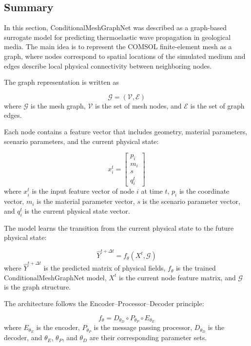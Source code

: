 \subsection{Summary}

In this section, ConditionalMeshGraphNet was described as a graph-based surrogate model for predicting thermoelastic wave propagation in geological media. The main idea is to represent the COMSOL finite-element mesh as a graph, where nodes correspond to spatial locations of the simulated medium and edges describe local physical connectivity between neighboring nodes.

The graph representation is written as

\begin{equation}
\mathcal{G}
=
(\mathcal{V},\mathcal{E})
\end{equation}
where \(\mathcal{G}\) is the mesh graph, \(\mathcal{V}\) is the set of mesh nodes, and \(\mathcal{E}\) is the set of graph edges.

Each node contains a feature vector that includes geometry, material parameters, scenario parameters, and the current physical state:

\begin{equation}
x_i^t
=
\begin{bmatrix}
p_i \\
m_i \\
s \\
q_i^t
\end{bmatrix}
\end{equation}
where \(x_i^t\) is the input feature vector of node \(i\) at time \(t\), \(p_i\) is the coordinate vector, \(m_i\) is the material parameter vector, \(s\) is the scenario parameter vector, and \(q_i^t\) is the current physical state vector.

The model learns the transition from the current physical state to the future physical state:

\begin{equation}
\hat{Y}^{t+\Delta t}
=
f_{\theta}
\left(
X^{t},
\mathcal{G}
\right)
\end{equation}
where \(\hat{Y}^{t+\Delta t}\) is the predicted matrix of physical fields, \(f_{\theta}\) is the trained ConditionalMeshGraphNet model, \(X^{t}\) is the current node feature matrix, and \(\mathcal{G}\) is the graph structure.

The architecture follows the Encoder--Processor--Decoder principle:

\begin{equation}
f_{\theta}
=
D_{\theta_D}
\circ
P_{\theta_P}
\circ
E_{\theta_E}
\end{equation}
where \(E_{\theta_E}\) is the encoder, \(P_{\theta_P}\) is the message passing processor, \(D_{\theta_D}\) is the decoder, and \(\theta_E\), \(\theta_P\), and \(\theta_D\) are their corresponding parameter sets.

